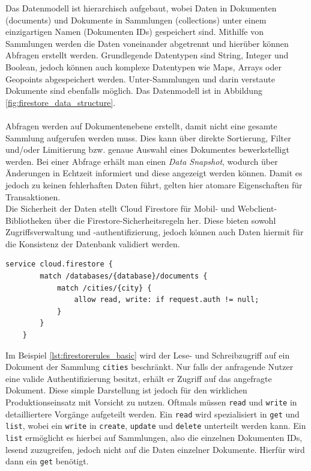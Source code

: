 \noindent
Das Datenmodell ist hierarchisch aufgebaut, wobei Daten in Dokumenten (documents) und Dokumente in Sammlungen (collections) unter einem einzigartigen Namen (Dokumenten IDs) gespeichert sind. 
Mithilfe von Sammlungen werden die Daten voneinander abgetrennt und hierüber können Abfragen erstellt werden.
Grundlegende Datentypen sind String, Integer und Boolean, jedoch können auch komplexe Datentypen wie Maps, Arrays oder Geopoints abgespeichert werden. Unter-Sammlungen und darin verstaute Dokumente sind ebenfalls möglich.
Das Datenmodell ist in Abbildung \ref{fig:firestore_data_structure}.\\
\\
Abfragen werden auf Dokumentenebene erstellt, damit nicht eine gesamte Sammlung aufgerufen werden muss.
Dies kann über direkte Sortierung, Filter und/oder Limitierung bzw. genaue Auswahl eines Dokumentes bewerkstelligt werden.
Bei einer Abfrage erhält man einen \textit{Data Snapshot}, wodurch über Änderungen in Echtzeit informiert und diese angezeigt werden können.
Damit es jedoch zu keinen fehlerhaften Daten führt, gelten hier atomare Eigenschaften für Transaktionen.\\
Die Sicherheit der Daten stellt Cloud Firestore für Mobil- und Webclient-Bibliotheken über die Firestore-Sicherheitsregeln her. Diese bieten sowohl Zugriffsverwaltung und -authentifizierung, jedoch können auch Daten hiermit für die Konsistenz der Datenbank validiert werden. 
\medskip
\begin{lstlisting}[caption=Beschränkung des Zugriffs auf Dokumente der Sammlung \texttt{cities}, label=lst:firestorerules_basic]
	service cloud.firestore {
		match /databases/{database}/documents {
			match /cities/{city} {
				allow read, write: if request.auth != null;
			}
		}
	}
\end{lstlisting}
\medskip
Im Beispiel \ref{lst:firestorerules_basic} wird der Lese- und Schreibzugriff auf ein Dokument der Sammlung \texttt{cities} beschränkt. 
Nur falls der anfragende Nutzer eine valide Authentifizierung besitzt, erhält er Zugriff auf das angefragte Dokument. 
Diese simple Darstellung ist jedoch für den wirklichen Produktionseinsatz mit Vorsicht zu nutzen. 
Oftmals müssen \texttt{read} und \texttt{write} in detailliertere Vorgänge aufgeteilt werden. Ein \texttt{read} wird spezialisiert in \texttt{get} und \texttt{list}, wobei ein \texttt{write} in \texttt{create}, \texttt{update} und \texttt{delete} unterteilt werden kann.
Ein \texttt{list} ermöglicht es hierbei auf Sammlungen, also die einzelnen Dokumenten IDs, lesend zuzugreifen, jedoch nicht auf die Daten einzelner Dokumente. Hierfür wird dann ein \texttt{get} benötigt. 
